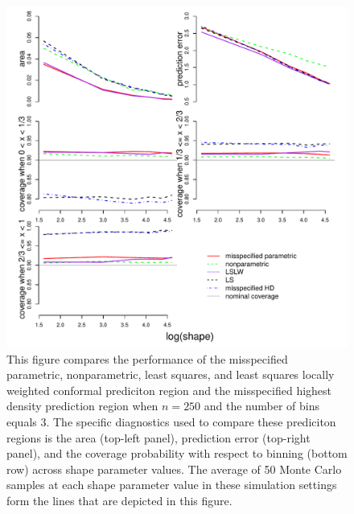 \documentclass[11pt]{article}\usepackage[]{graphicx}\usepackage[]{color}
\makeatletter
\def\maxwidth{ %
  \ifdim\Gin@nat@width>\linewidth
    \linewidth
  \else
    \Gin@nat@width
  \fi
}
\newenvironment{knitrout}{}{} %
\makeatother
\begin{document}
\newpage
\begin{figure}[h!]
\begin{center}
\begin{knitrout}
\color{fgcolor}
\includegraphics[width=\maxwidth]{figure/Fig-misspec-250-1} 

\end{knitrout}
\end{center}
\caption{This figure compares the performance of the 
  misspecified parametric,
  nonparametric,
  least squares, and 
  least squares locally weighted conformal prediciton region and the 
  misspecified highest density prediction region when $n = 250$ and the 
  number of bins equals 3.  
  The specific diagnostics used to compare these prediciton regions is the 
    area (top-left panel),
    prediction error (top-right panel), and
    the coverage probability with respect to binning (bottom row) 
    across shape parameter values.
  The average of 50 Monte Carlo samples at each shape parameter value in 
  these simulation settings form the lines that are depicted in this figure.}
\label{Fig:misspec.250}
\end{figure}
\end{document}
